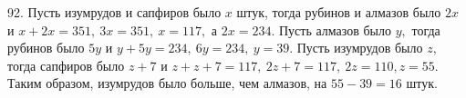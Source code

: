 92. Пусть изумрудов и сапфиров было $x$ штук, тогда рубинов и алмазов было $2x$ и $x+2x=351,\ 3x=351,\ x=117,$ а $2x=234.$ Пусть алмазов было $y,$ тогда рубинов было $5y$ и $y+5y=234,\ 6y=234,\ y=39.$ Пусть изумрудов было $z,$ тогда сапфиров было $z+7$ и $z+z+7=117,\ 2z+7=117,\ 2z=110, z=55.$ Таким образом, изумрудов было больше, чем алмазов, на $55-39=16$ штук.\\
